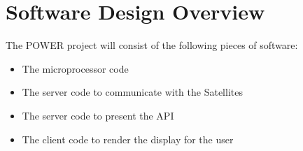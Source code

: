 \chapter{Software Design Overview}
The POWER project will consist of the following pieces of software:
\begin{itemize}
 \item The microprocessor code
 \item The server code to communicate with the Satellites
 \item The server code to present the API
 \item The client code to render the display for the user
\end{itemize}
